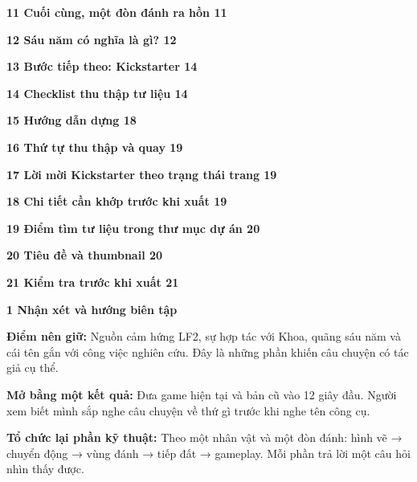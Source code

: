 \documentclass[10pt,a4paper]{article}
\begin{document}
\textbf{11 Cuối cùng, một đòn đánh ra hồn 11}\par

\textbf{12 Sáu năm có nghĩa là gì? 12}\par

\textbf{13 Bước tiếp theo: Kickstarter 14}\par

\textbf{14 Checklist thu thập tư liệu 14}\par

\textbf{15 Hướng dẫn dựng 18}\par

\textbf{16 Thứ tự thu thập và quay 19}\par

\textbf{17 Lời mời Kickstarter theo trạng thái trang 19}\par

\textbf{18 Chi tiết cần khớp trước khi xuất 19}\par

\textbf{19 Điểm tìm tư liệu trong thư mục dự án 20}\par

\textbf{20 Tiêu đề và thumbnail 20}\par

\textbf{21 Kiểm tra trước khi xuất 21}\par

\clearpage

\textbf{1 Nhận xét và hướng biên tập}\par

\textbf{Điểm nên giữ:}  Nguồn cảm hứng LF2, sự hợp tác với Khoa, quãng sáu năm và cái tên gắn với công việc nghiên cứu. Đây là những phần khiến câu chuyện có tác giả cụ thể.\par

\textbf{Mở bằng một kết quả:}  Đưa game hiện tại và bản cũ vào 12 giây đầu. Người xem biết mình sắp nghe câu chuyện về thứ gì trước khi nghe tên công cụ.\par

\textbf{Tổ chức lại phần kỹ thuật:}  Theo một nhân vật và một đòn đánh: hình vẽ → chuyển động → vùng đánh → tiếp đất → gameplay. Mỗi phần trả lời một câu hỏi nhìn thấy được.\par
\end{document}

